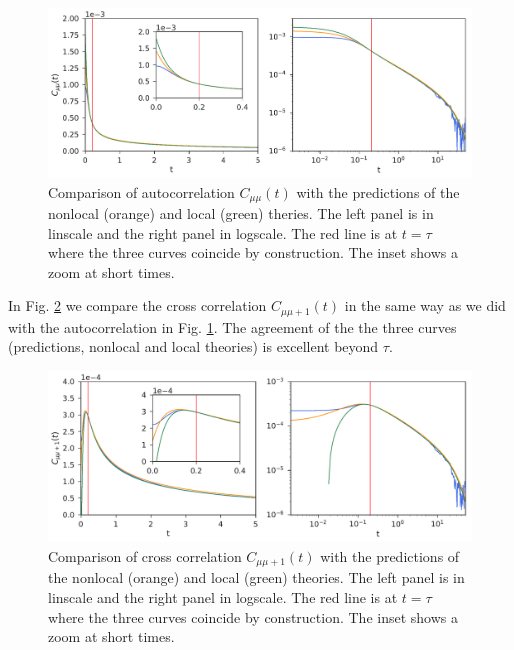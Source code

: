 \documentclass[b5paper,openright,10pt]{book}
\begin{document}
\begin{figure}[h!]
  \centering
\includegraphics[width=\linewidth]{Predictionsmumu-PBC}
\caption[Comparison of autocorrelation $C_{\mu\mu}$ with the predicions for an unconfined fluid]{Comparison of autocorrelation $C_{\mu\mu}(t)$ with the predictions of the nonlocal (orange) and local (green) theries. The left panel is in linscale and the right panel in logscale. The red line is at $t=\tau$ where the three curves coincide by construction. The inset shows a zoom at short times.}
\label{fig:Predictionsmumu-PBC}
\end{figure}

In Fig. \ref{fig:Predictionsmumu+1-PBC} we compare the cross correlation $C_{\mu\mu+1}(t)$ in the same way as we did with the autocorrelation in Fig. \ref{fig:Predictionsmumu-PBC}. The agreement of the the three curves (predictions, nonlocal and local theories) is excellent beyond $\tau$. 

\begin{figure}[h!]
  \centering
\includegraphics[width=\linewidth]{Predictionsmumu+1-PBC}
\caption[Comparison of cross correlation $C_{\mu\mu+1}$ with the predicions for an unconfined fluid]{Comparison of cross correlation $C_{\mu\mu+1}(t)$ with the predictions of the nonlocal (orange) and local (green) theories. The left panel is in linscale and the right panel in logscale. The red line is at $t=\tau$ where the three curves coincide by construction. The inset shows a zoom at short times.}
\label{fig:Predictionsmumu+1-PBC}
\end{figure}
\end{document}
